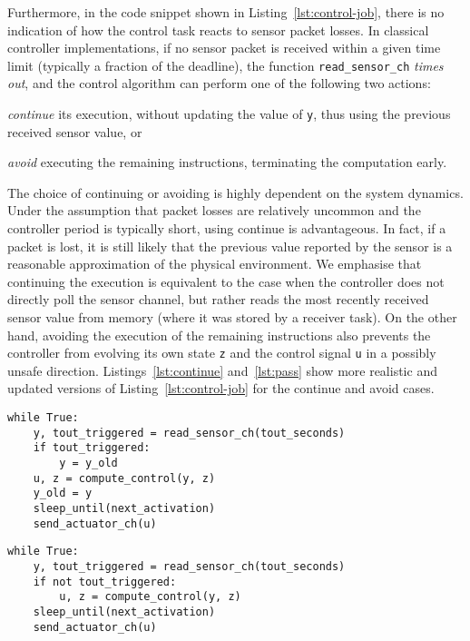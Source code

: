 Furthermore, in the code snippet shown in Listing~\ref{lst:control-job}, there is no indication of how the control task reacts to sensor packet losses.
In classical controller implementations, if no sensor packet is received within a given time limit (typically a fraction of the deadline), the function \texttt{read\_sensor\_ch} \emph{times out}, and the control algorithm can perform one of the following two actions:
%
\begin{enumerate*}[label=(\roman*)]
    \item \emph{continue} its execution, without updating the value of \texttt{y}, thus using the previous received sensor value, or
    \item \emph{avoid} executing the remaining instructions, terminating the computation early.
\end{enumerate*}

The choice of continuing or avoiding is highly dependent on the system dynamics.
Under the assumption that packet losses are relatively uncommon and the controller period is typically short, using continue is advantageous.
In fact, if a packet is lost, it is still likely that the previous value reported by the sensor is a reasonable approximation of the physical environment.
We emphasise that continuing the execution is equivalent to the case when the controller does not directly poll the sensor channel, but rather reads the most recently received sensor value from memory (where it was stored by a receiver task).
On the other hand, avoiding the execution of the remaining instructions also prevents the controller from evolving its own state \texttt{z} and the control signal \texttt{u} in a possibly unsafe direction.
Listings~\ref{lst:continue} and~\ref{lst:pass} show more realistic and updated versions of Listing~\ref{lst:control-job} for the continue and avoid cases.

\begin{lstlisting}[label=lst:continue,caption={Control code execution when the control computation is continued if the sensor reading function \texttt{read\_sensor\_ch} results in a timeout.}]
while True:
    y, tout_triggered = read_sensor_ch(tout_seconds)
    if tout_triggered:
        y = y_old
    u, z = compute_control(y, z)
    y_old = y
    sleep_until(next_activation)
    send_actuator_ch(u)
\end{lstlisting}
%
\begin{lstlisting}[label=lst:pass,caption={Control code execution when the control computation is avoided if the sensor reading function \texttt{read\_sensor\_ch} results in a timeout.}]
while True:
    y, tout_triggered = read_sensor_ch(tout_seconds)
    if not tout_triggered:
        u, z = compute_control(y, z)
    sleep_until(next_activation)
    send_actuator_ch(u)
\end{lstlisting}

